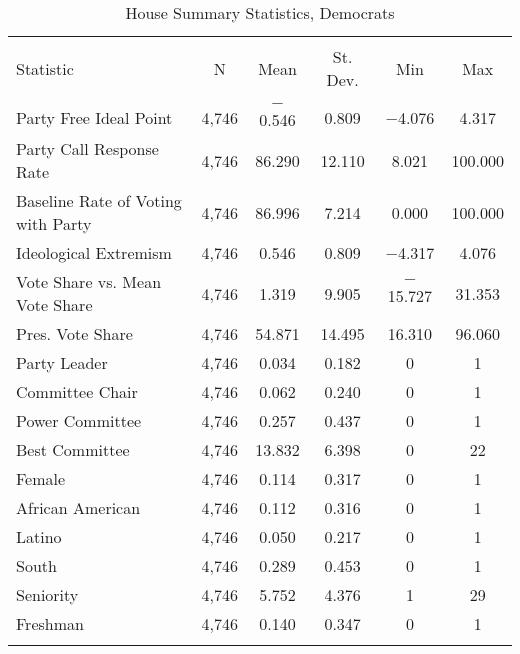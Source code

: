 \documentclass[12pt]{article}
\begin{document}
\begin{table}[H] 
	\centering 
	\singlespacing
	\caption{House Summary Statistics, Democrats} 
	\label{} 
	\begin{tabular}{@{\extracolsep{5pt}}lccccc} 
		\\[-1.8ex]\hline 
		\hline \\[-1.8ex] 
		Statistic & \multicolumn{1}{c}{N} & \multicolumn{1}{c}{Mean} & \multicolumn{1}{c}{St. Dev.} & \multicolumn{1}{c}{Min} & \multicolumn{1}{c}{Max} \\ 
		\hline \\[-1.8ex]  
		Party Free Ideal Point & 4,746 & $-$0.546 & 0.809 & $-$4.076 & 4.317 \\ 
		Party Call Response Rate & 4,746 & 86.290 & 12.110 & 8.021 & 100.000 \\ 
		Baseline Rate of Voting with Party & 4,746 & 86.996 & 7.214 & 0.000 & 100.000 \\ 
		Ideological Extremism & 4,746 & 0.546 & 0.809 & $-$4.317 & 4.076 \\ 
		Vote Share vs. Mean Vote Share & 4,746 & 1.319 & 9.905 & $-$15.727 & 31.353 \\
		Pres. Vote Share & 4,746 & 54.871 & 14.495 & 16.310 & 96.060 \\ 
		Party Leader & 4,746 & 0.034 & 0.182 & 0 & 1 \\ 
		Committee Chair & 4,746 & 0.062 & 0.240 & 0 & 1 \\
		Power Committee & 4,746 & 0.257 & 0.437 & 0 & 1 \\
		Best Committee & 4,746 & 13.832 & 6.398 & 0 & 22 \\
		Female & 4,746 & 0.114 & 0.317 & 0 & 1 \\ 
		African American & 4,746 & 0.112 & 0.316 & 0 & 1 \\ 
		Latino & 4,746 & 0.050 & 0.217 & 0 & 1 \\ 
		South & 4,746 & 0.289 & 0.453 & 0 & 1 \\ 		 
		Seniority & 4,746 & 5.752 & 4.376 & 1 & 29 \\ 
		Freshman & 4,746 & 0.140 & 0.347 & 0 & 1 \\ 
		\hline \\[-1.8ex] 
	\end{tabular} 
\end{table} 
\end{document}
